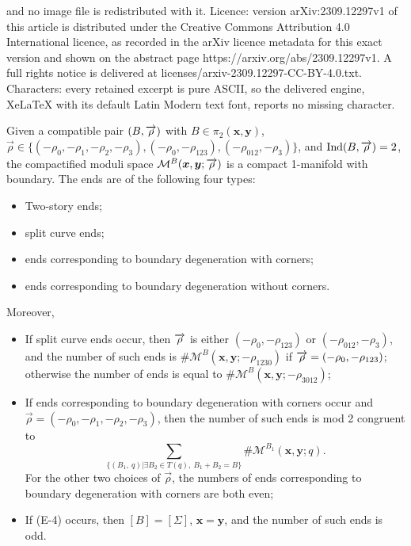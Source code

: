 \documentclass[10pt,a4paper]{amsart}
\begin{document}
and no image file is redistributed with it. Licence: version arXiv:2309.12297v1 of this article is distributed under the Creative Commons Attribution 4.0 International licence, as recorded in the arXiv licence metadata for this exact version and shown on the abstract page https://arxiv.org/abs/2309.12297v1. A full rights notice is delivered at licenses/arxiv-2309.12297-CC-BY-4.0.txt. Characters: every retained excerpt is pure ASCII, so the delivered engine, XeLaTeX with its default Latin Modern text font, reports no missing character.
\begin{prop}\label{Proposition, ends of 1-dimensional moduli spaces of 0-P curves, Reeb element of length 4}
Given a compatible pair $(B,\overrightarrow{\bold{\rho}})$ with $B\in \pi_2(\bm{x},\bm{y})$, $\overrightarrow{\rho}\in\{(-\rho_0,-\rho_1,-\rho_2,-\rho_3),(-\rho_0,-\rho_{123}),(-\rho_{012},-\rho_3)\}$, and $\text{Ind}(B,\overrightarrow{\bold{\rho}})=2$, the compactified moduli space $\mathcal{M}^B(\bm{x},\bm{y};\overrightarrow{\bold{\rho}})$ is a compact 1-manifold with boundary. The ends are of the following four types:
\begin{itemize}
\item[(E-1)]Two-story ends;
\item[(E-2)]split curve ends;
\item[(E-3)]ends corresponding to boundary degeneration with corners;
\item[(E-4)]ends corresponding to boundary degeneration without corners.
\end{itemize}
Moreover, 
\begin{itemize}
\item[(a)]If split curve ends occur, then $\overrightarrow{\bold{\rho}}$ is either $(-\rho_0,-\rho_{123})$ or $(-\rho_{012},-\rho_3)$, and the number of such ends is $\#\mathcal{M}^B(\bm{x},\bm{y};-\rho_{1230})$ if $\overrightarrow{\bold{\rho}}=(-\rho_0,-\rho_{123})$; otherwise the number of ends is equal to $\#\mathcal{M}^B(\bm{x},\bm{y};-\rho_{3012})$;
\item[(b)]If ends corresponding to boundary degeneration with corners occur and $\overrightarrow{\rho}=(-\rho_0,-\rho_1,-\rho_2,-\rho_3)$, then the number of such ends is mod 2 congruent to $$\sum_{\{(B_1,\ q)|\exists B_2\in T(q),\ B_1+B_2=B\}}\#\mathcal{M}^{B_1}(\bm{x},\bm{y};q).$$
For the other two choices of $\overrightarrow{\rho}$, the numbers of ends corresponding to boundary degeneration with corners are both even;
\item[(c)]If (E-4) occurs, then $[B]=[\Sigma]$, $\bm{x}=\bm{y}$, and the number of such ends is odd.
\end{itemize}
\end{prop}
\end{document}
